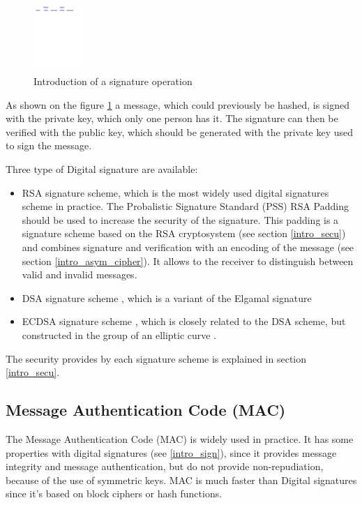 \begin{figure}[!ht]
\centering
\includegraphics[trim=2cm 25.5cm 5cm 0cm,
height=2.5cm]{figures/intro_signature.pdf}
\caption{Introduction of a signature operation}
\label{fig:sign}
\end{figure}

As shown on the figure \ref{fig:sign} a message, which could previously be
hashed, is signed with the private key, which only one person has it.
The signature can then be verified with the public key, which should be
generated with the private key used to sign the message.

Three type of Digital signature are available:
\begin{itemize}
  \item RSA signature scheme, which is the most widely used digital signatures
  scheme in practice.\newline
  The Probalistic Signature Standard (PSS) RSA Padding \cite{RFC3447} should be
  used to increase the security of the signature. This padding is a signature
  scheme based on the RSA cryptosystem (see section \ref{intro_secu}) and
  combines signature and verification with an encoding of the message (see
  section \ref{intro_asym_cipher}). It allows to the receiver to distinguish
  between valid and invalid messages.
  \item DSA signature scheme \cite{RFC6979}, which is a variant of the Elgamal
  signature \cite{wiki:elgamal}
  \item ECDSA signature scheme \cite{RFC6979}, which is closely related to the
  DSA scheme, but constructed in the group of an elliptic curve \cite{RFC4492}.
\end{itemize}

The security provides by each signature scheme is explained in section
\ref{intro_secu}.

\subsection{Message Authentication Code (MAC)}
\label{intro_mac}

The Message Authentication Code (MAC) is widely used in practice. It has some
properties with digital signatures (see \ref{intro_sign}), since it provides
message integrity and message authentication, but do not provide
non-repudiation, because of the use of symmetric keys.
MAC is much faster than Digital signatures since it's based on block ciphers or
hash functions.

